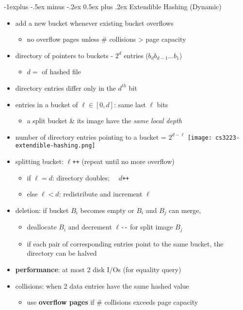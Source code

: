 \documentclass[10pt, landscape]{article}
\makeatletter
\renewcommand{\subsection}{\@startsection{subsection}{2}{0mm}%
  {-1explus -.5ex minus -.2ex}%
  {0.5ex plus .2ex}%
{\normalfont\normalsize\bfseries}}
\makeatother
\begin{document}
\begin{multicols*}{4}
  \subsection{Extendible Hashing (Dynamic)}

  \begin{itemize}
    \item add a new bucket whenever existing bucket overflows
          \begin{itemize}
            \item no overflow pages unless \# collisions > page capacity
          \end{itemize}
    \item directory of pointers to buckets - $2^d$ entries ($b_db_{d-1}\dots b_1$)
          \begin{itemize}
            \item $d=$  of hashed file
          \end{itemize}
    \item {} directory entries differ only in the $d^{th}$ bit
    \item entries in a bucket of  $\ell \in [0,d]$: same last $\ell$ bits
          \begin{itemize}
            \item a split bucket \& its image have the \textit{same local depth}
          \end{itemize}
    \item number of directory entries pointing to a bucket = $2^{d-\ell}$
          \texttt{[image: cs3223-extendible-hashing.png]}
    \item splitting bucket: $\ell$\texttt{++} (repeat until no more overflow)
          \begin{itemize}
            \item if $\ell = d$: directory doubles; $\quad d$\texttt{++}
            \item else $\ell < d$: redistribute and increment $\ell$
          \end{itemize}
    \item deletion: if bucket $B_i$ becomes empty or $B_i$ and $B_j$ can merge,
          \begin{itemize}
            \item deallocate $B_i$ and decrement $\ell$\texttt{-{}-} for split image $B_j$
            \item if each pair of corresponding entries point to the same bucket, the directory can be halved
          \end{itemize}
    \item \textbf{performance}: at most 2 disk I/Os (for equality query)
    \item collisions: when 2 data entries have the same hashed value
          \begin{itemize}
            \item use \textbf{overflow pages} if \# collisions exceeds page capacity
          \end{itemize}
  \end{itemize}


\end{multicols*}
\end{document}
